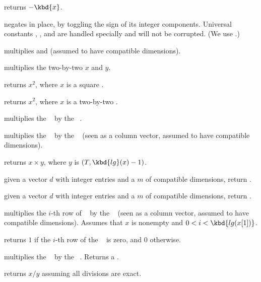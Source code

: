  returns $-\kbd{x}$.

 negates  in place, by toggling the
sign of its integer components. Universal constants ,
,  and  are handled specially and will
not be corrupted. (We use .)

 multiplies  and  (assumed to
have compatible dimensions).

 multiplies the two-by-two  $x$ and $y$.

 returns $x^2$, where $x$ is a square .

 returns $x^2$, where $x$ is a two-by-two .

 multiplies the ~
by the ~.

 multiplies the ~
by the ~ (seen as a column vector, assumed to have compatible
dimensions).

 returns $x \times y$, where $y$
is $(T, \kbd{lg}(x)-1)$.

 given a vector $d$ with integer entries
and a  $m$ of compatible dimensions, return .

 given a vector $d$ with integer entries
 and a  $m$ of compatible dimensions, return .




 multiplies the $i$-th row
of ~ by the ~ (seen as a column vector, assumed
to have compatible dimensions). Assumes that $x$ is nonempty and
$0 < i < \kbd{lg(x[1])}$.

 returns $1$ if the $i$-th row of
the ~ is zero, and $0$ otherwise.

 multiplies the ~
by the ~. Returns a .

 returns $x/y$ assuming all divisions
are exact.


